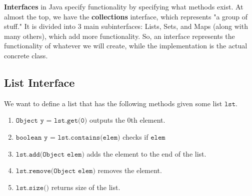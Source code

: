 \documentclass{article}
\begin{document}
  \textbf{Interfaces} in Java specify functionality by specifying what methods exist. At almost the top, we have the \textbf{collections} interface, which represents "a group of stuff." It is divided into 3 main subinterfaces: Lists, Sets, and Maps (along with many others), which add more functionality. So, an interface represents the functionality of whatever we will create, while the implementation is the actual concrete class. 

  \subsection{List Interface}

    We want to define a list that has the following methods given some list $\texttt{lst}$. 
    \begin{enumerate}
      \item $\texttt{Object y = lst.get(0)}$ outputs the $0$th element. 
      \item $\texttt{boolean y = lst.contains(elem)}$ checks if $\texttt{elem}$ 
      \item $\texttt{lst.add(Object elem)}$ adds the element to the end of the list. 
      \item $\texttt{lst.remove(Object elem)}$ removes the element. 
      \item $\texttt{lst.size()}$ returns size of the list. 
    \end{enumerate}
\end{document}
